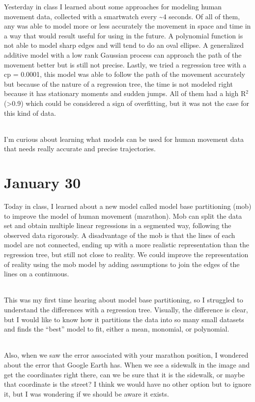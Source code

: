 \documentclass[
]{book}
\begin{document}
Yesterday in class I learned about some approaches for modeling human movement data, collected with a smartwatch every \textasciitilde4 seconds. Of all of them, any was able to model more or less accurately the movement in space and time in a way that would result useful for using in the future. A polynomial function is not able to model sharp edges and will tend to do an oval ellipse. A generalized additive model with a low rank Gaussian process can approach the path of the movement better but is still not precise. Lastly, we tried a regression tree with a cp = 0.0001, this model was able to follow the path of the movement accurately but because of the nature of a regression tree, the time is not modeled right because it has stationary moments and sudden jumps. All of them had a high R\(^2\) (\textgreater0.9) which could be considered a sign of overfitting, but it was not the case for this kind of data.\\
\strut \\
I'm curious about learning what models can be used for human movement data that needs really accurate and precise trajectories.

\hypertarget{january-30}{%
\section{January 30}\label{january-30}}

Today in class, I learned about a new model called model base partitioning (mob) to improve the model of human movement (marathon). Mob can split the data set and obtain multiple linear regressions in a segmented way, following the observed data rigorously. A disadvantage of the mob is that the lines of each model are not connected, ending up with a more realistic representation than the regression tree, but still not close to reality. We could improve the representation of reality using the mob model by adding assumptions to join the edges of the lines on a continuous.\\
\strut \\
This was my first time hearing about model base partitioning, so I struggled to understand the differences with a regression tree. Visually, the difference is clear, but I would like to know how it partitions the data into so many small datasets and finds the ``best'' model to fit, either a mean, monomial, or polynomial.\\
\strut \\
Also, when we saw the error associated with your marathon position, I wondered about the error that Google Earth has. When we see a sidewalk in the image and get the coordinates right there, can we be sure that it is the sidewalk, or maybe that coordinate is the street? I think we would have no other option but to ignore it, but I was wondering if we should be aware it exists.
\end{document}
